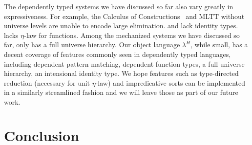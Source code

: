 \documentclass[acmsmall]{acmart}
\newcommand{\lang}{$\lambda^H$\xspace}
\begin{document}
The dependently typed systems we have discussed so far also vary
greatly in expressiveness. For example, the Calculus of
Constructions~\citep{CoC} and MLTT without universe levels are unable
to encode large elimination. \citet{decagda} and \citet{nbeincoq} lack
identity types. \citet{nbeincoq} lacks $\eta$-law for functions. Among
the mechanized systems we have discussed so far, only
\citet{anand2014towards} has a full universe hierarchy.
Our object language \lang{}, while small, has a decent coverage of
features commonly seen in dependently typed languages, including
dependent pattern matching, dependent function types, a full universe
hierarchy, an intensional identity type. We hope features such as
type-directed reduction (necessary for unit $\eta$-law) and
impredicative sorts can be implemented in a similarly streamlined
fashion and we will leave those as part of our future work.

\section{Conclusion}
\label{sec:conclusion}









\end{document}
